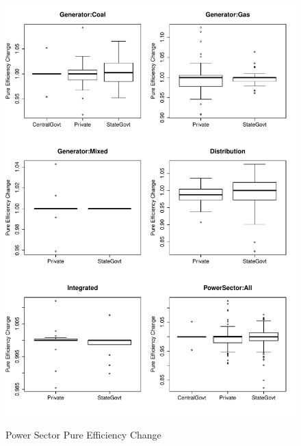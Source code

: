 \begin{figure}[ht]
	\centering
	\caption{Power Sector Pure Efficiency Change}
		\includegraphics[width=1.00\textwidth]{chapter03/PureEffChange.pdf}
	\label{fig:PureEffChange}
\end{figure}

